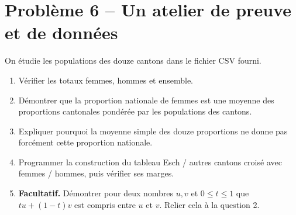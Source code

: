 \section*{Problème 6 -- Un atelier de preuve et de données}
On étudie les populations des douze cantons dans le fichier CSV fourni.
\begin{enumerate}
\item Vérifier les totaux femmes, hommes et ensemble.
\item Démontrer que la proportion nationale de femmes est une moyenne des proportions cantonales pondérée par les populations des cantons.
\item Expliquer pourquoi la moyenne simple des douze proportions ne donne pas forcément cette proportion nationale.
\item Programmer la construction du tableau Esch / autres cantons croisé avec femmes / hommes, puis vérifier ses marges.
\item \textbf{Facultatif.} Démontrer pour deux nombres $u,v$ et $0\le t\le1$ que $tu+(1-t)v$ est compris entre $u$ et $v$. Relier cela à la question 2.
\end{enumerate}
